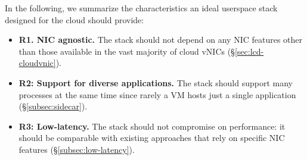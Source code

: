 In the following, we summarize the characteristics an ideal userspace stack designed for the cloud should provide:
\begin{itemize}
    \item \textbf{R1. NIC agnostic.} The stack should not depend on any NIC features other than those available in the vast majority of cloud vNICs (\S\ref{sec:lcd-cloudvnic}).
    \item \textbf{R2: Support for diverse applications.} The stack should support many processes at the same time since rarely a VM hosts just a single application (\S\ref{subsec:sidecar}).
    \item \textbf{R3: Low-latency.} The stack should not compromise on performance: it should be comparable with existing approaches that rely on specific NIC features (\S\ref{subsec:low-latency}).
\end{itemize}


